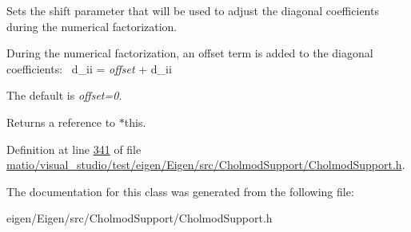 Sets the shift parameter that will be used to adjust the diagonal coefficients during the numerical factorization.

During the numerical factorization, an offset term is added to the diagonal coefficients\+:~\newline
{\ttfamily d\+\_\+ii} = {\itshape offset} + {\ttfamily d\+\_\+ii} 

The default is {\itshape offset=0}.

\begin{DoxyReturn}{Returns}
a reference to {\ttfamily $\ast$this}. 
\end{DoxyReturn}


Definition at line \hyperlink{matio_2visual__studio_2test_2eigen_2_eigen_2src_2_cholmod_support_2_cholmod_support_8h_source_l00341}{341} of file \hyperlink{matio_2visual__studio_2test_2eigen_2_eigen_2src_2_cholmod_support_2_cholmod_support_8h_source}{matio/visual\+\_\+studio/test/eigen/\+Eigen/src/\+Cholmod\+Support/\+Cholmod\+Support.\+h}.



The documentation for this class was generated from the following file\+:\begin{DoxyCompactItemize}
\item 
eigen/\+Eigen/src/\+Cholmod\+Support/\+Cholmod\+Support.\+h\end{DoxyCompactItemize}
